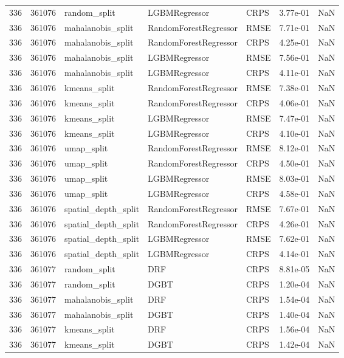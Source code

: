 \begin{tabular}{rrlllrr}
336 & 361076 & random\_split & LGBMRegressor & CRPS & 3.77e-01 & NaN \\
336 & 361076 & mahalanobis\_split & RandomForestRegressor & RMSE & 7.71e-01 & NaN \\
336 & 361076 & mahalanobis\_split & RandomForestRegressor & CRPS & 4.25e-01 & NaN \\
336 & 361076 & mahalanobis\_split & LGBMRegressor & RMSE & 7.56e-01 & NaN \\
336 & 361076 & mahalanobis\_split & LGBMRegressor & CRPS & 4.11e-01 & NaN \\
336 & 361076 & kmeans\_split & RandomForestRegressor & RMSE & 7.38e-01 & NaN \\
336 & 361076 & kmeans\_split & RandomForestRegressor & CRPS & 4.06e-01 & NaN \\
336 & 361076 & kmeans\_split & LGBMRegressor & RMSE & 7.47e-01 & NaN \\
336 & 361076 & kmeans\_split & LGBMRegressor & CRPS & 4.10e-01 & NaN \\
336 & 361076 & umap\_split & RandomForestRegressor & RMSE & 8.12e-01 & NaN \\
336 & 361076 & umap\_split & RandomForestRegressor & CRPS & 4.50e-01 & NaN \\
336 & 361076 & umap\_split & LGBMRegressor & RMSE & 8.03e-01 & NaN \\
336 & 361076 & umap\_split & LGBMRegressor & CRPS & 4.58e-01 & NaN \\
336 & 361076 & spatial\_depth\_split & RandomForestRegressor & RMSE & 7.67e-01 & NaN \\
336 & 361076 & spatial\_depth\_split & RandomForestRegressor & CRPS & 4.26e-01 & NaN \\
336 & 361076 & spatial\_depth\_split & LGBMRegressor & RMSE & 7.62e-01 & NaN \\
336 & 361076 & spatial\_depth\_split & LGBMRegressor & CRPS & 4.14e-01 & NaN \\
336 & 361077 & random\_split & DRF & CRPS & 8.81e-05 & NaN \\
336 & 361077 & random\_split & DGBT & CRPS & 1.20e-04 & NaN \\
336 & 361077 & mahalanobis\_split & DRF & CRPS & 1.54e-04 & NaN \\
336 & 361077 & mahalanobis\_split & DGBT & CRPS & 1.40e-04 & NaN \\
336 & 361077 & kmeans\_split & DRF & CRPS & 1.56e-04 & NaN \\
336 & 361077 & kmeans\_split & DGBT & CRPS & 1.42e-04 & NaN \\

\end{tabular}
